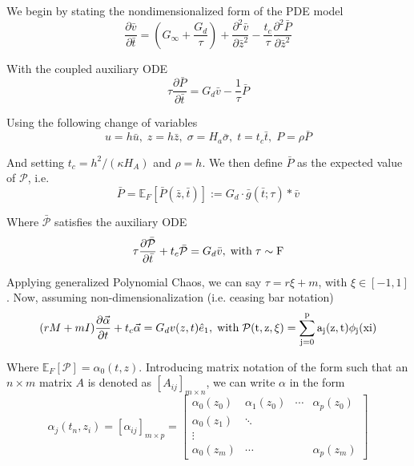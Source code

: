 \documentclass[12pt,letterpaper]{article}
\author{}
\date{}
\title{}
\newcommand{\field}[1]{\mathbb{#1}} %
\newcommand{\script}[1]{\mathcal{#1}} %
\newcommand{\pd}[2]{\frac{\partial#1}{\partial#2}}
\newcommand{\m}[3]{\left[#1_{ij}\right]_{#2\times #3}}
\begin{document}
We begin by stating the nondimensionalized form of the PDE model
\begin{equation} \label{eq:ndpdemodel}
\pd{\bar{v}}{\bar{t}} = \left(G_{\infty} + \frac{G_d}{\tau}\right) +
\pd{^2\bar{v}}{\bar{z}^2} - \frac{t_c}{\tau} \pd{^2\bar{P}}{\bar{z}^2}
\end{equation}

With the coupled auxiliary ODE
\begin{equation} \label{eq:auxode}
\tau \pd{\bar{P}}{\bar{t}} = G_d \bar{v} - \frac{1}{\tau} \bar{P}
\end{equation}

Using the following change of variables
\begin{equation*} \label{eq:changeofvariables}
u=h\bar{u},\;z=h\bar{z},\;\sigma = H_a\bar{\sigma},\; t = t_c \bar{t},\;P=\rho\bar{P}
\end{equation*}

And setting $t_c = h^2/(\kappa H_A)$ and $\rho = h$. We then define
$\bar{P}$ as the expected value of $\script{P}$, i.e.
\begin{equation} \label{eq:pexpsp}
\bar{P} = \field{E}_F \left[\bar{P}(\bar{z},\bar{t})\right] :=
G_d \cdot \bar{g} (\bar{t}; \tau) * \bar{v}
\end{equation}

Where $\bar{\script{P}}$ satisfies the auxiliary ODE
\begin{equation} \label{eq:scriptpode}
\tau \pd{\bar{\script{P}}}{\bar{t}} + t_c \bar{\script{P}} = G_d \bar{v},\;
\rm{with}\; \tau \sim F
\end{equation}

Applying generalized Polynomial Chaos, we can say $\tau = r\xi +m$, with
$\xi \in [-1,1]$. Now, assuming non-dimensionalization (i.e. ceasing bar
notation)
\begin{equation} \label{eq:auxodewithgpc}
(rM+mI) \pd{\vec{\alpha}}{t} + t_c\vec{\alpha} = G_d v(z,t) \hat{e}_1,\;
\rm{with}\; \script{P}(t,z,\xi) = \sum_{j=0}^{p} a_j(z,t)\phi_j(xi) 
\end{equation}

Where $\field{E}_F \left[\script{P}\right] = \alpha_0 (t,z)$. Introducing
matrix notation of the form such that an $n\times m$ matrix $A$ is denoted
as $\left[A_{ij}\right]_{m\times n}$, we can write $\alpha$ in the form
\begin{equation}
\alpha_j(t_n,z_i) = \m{\alpha}{m}{p} =
\left[ \begin{array}{cccc}
\alpha_0 (z_0)	&	\alpha_1 (z_0)	&	\cdots	&	\alpha_p (z_0)	\\
\alpha_0 (z_1)	&	\ddots			&			&				  	\\
\vdots			&					&			&					\\
\alpha_0 (z_m)	&	\cdots			&			&	\alpha_p (z_m)
\end{array}\right]
\end{equation}
\end{document}
